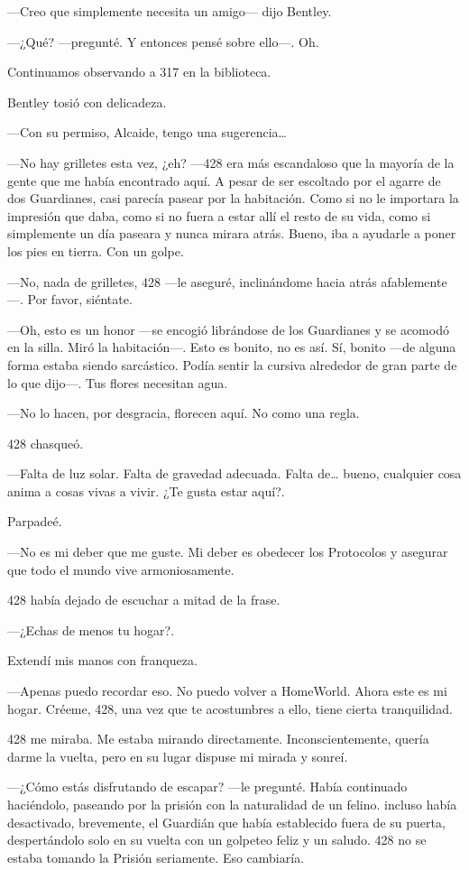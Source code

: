 ---Creo que simplemente necesita un amigo--- dijo Bentley.

---¿Qué? ---pregunté. Y entonces pensé sobre ello---. Oh.

Continuamos observando a 317 en la biblioteca.

Bentley tosió con delicadeza.

---Con su permiso, Alcaide, tengo una sugerencia\ldots{}

---No hay grilletes esta vez, ¿eh? ---428 era más escandaloso que la
mayoría de la gente que me había encontrado aquí. A pesar de ser
escoltado por el agarre de dos Guardianes, casi parecía pasear por la
habitación. Como si no le importara la impresión que daba, como si no
fuera a estar allí el resto de su vida, como si simplemente un día
paseara y nunca mirara atrás. Bueno, iba a ayudarle a poner los pies en
tierra. Con un golpe.

---No, nada de grilletes, 428 ---le aseguré, inclinándome hacia atrás
afablemente---. Por favor, siéntate.

---Oh, esto es un honor ---se encogió librándose de los Guardianes y se
acomodó en la silla. Miró la habitación---. Esto es bonito, no es así.
Sí, bonito ---de alguna forma estaba siendo sarcástico. Podía sentir la
cursiva alrededor de gran parte de lo que dijo---. Tus flores necesitan
agua.

---No lo hacen, por desgracia, florecen aquí. No como una regla.

428 chasqueó.

---Falta de luz solar. Falta de gravedad adecuada. Falta de\ldots{}
bueno, cualquier cosa anima a cosas vivas a vivir. ¿Te gusta estar
aquí?.

Parpadeé.

---No es mi deber que me guste. Mi deber es obedecer los Protocolos y
asegurar que todo el mundo vive armoniosamente.

428 había dejado de escuchar a mitad de la frase.

---¿Echas de menos tu hogar?.

Extendí mis manos con franqueza.

---Apenas puedo recordar eso. No puedo volver a HomeWorld. Ahora este es
mi hogar. Créeme, 428, una vez que te acostumbres a ello, tiene cierta
tranquilidad.

428 me miraba. Me estaba mirando directamente. Inconscientemente, quería
darme la vuelta, pero en su lugar dispuse mi mirada y sonreí.

---¿Cómo estás disfrutando de escapar? ---le pregunté. Había continuado
haciéndolo, paseando por la prisión con la naturalidad de un felino.
incluso había desactivado, brevemente, el Guardián que había establecido
fuera de su puerta, despertándolo solo en su vuelta con un golpeteo
feliz y un saludo. 428 no se estaba tomando la Prisión seriamente. Eso
cambiaría.

